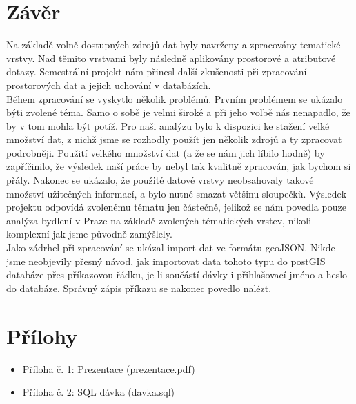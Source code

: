 \documentclass[a4paper, 12pt]{article}
\begin{document}
\clearpage

\section{Závěr}
Na základě volně dostupných zdrojů dat byly navrženy a zpracovány tematické vrstvy. Nad těmito vrstvami byly následně aplikovány prostorové a atributové dotazy. Semestrální projekt nám přinesl další zkušenosti při zpracování prostorových dat a jejich uchování v databázích.\\

Během zpracování se vyskytlo několik problémů. Prvním problémem se ukázalo býti zvolené téma. Samo o sobě je velmi široké a při jeho volbě nás nenapadlo, že by v tom mohla být potíž. Pro naši analýzu bylo k dispozici ke stažení velké množství dat, z nichž jsme se rozhodly použít jen několik zdrojů a ty zpracovat podrobněji. Použití velkého množství dat (a že se nám jich líbilo hodně) by zapříčinilo, že výsledek naší práce by nebyl tak kvalitně zpracován, jak bychom si přály. Nakonec se ukázalo, že použité datové vrstvy neobsahovaly takové množství užitečných informací, a bylo nutné smazat většinu sloupečků. Výsledek projektu odpovídá zvolenému tématu jen částečně, jelikož se nám povedla pouze analýza bydlení v Praze na základě zvolených tématických vrstev, nikoli komplexní jak jsme původně zamýšlely.\\

Jako zádrhel při zpracování se ukázal import dat ve formátu geoJSON. Nikde jsme neobjevily přesný návod, jak importovat data tohoto typu do postGIS databáze přes příkazovou řádku, je-li součástí dávky i přihlašovací jméno a heslo do databáze. Správný zápis příkazu se nakonec povedlo nalézt. 
\clearpage

\section{Přílohy} 

\begin{itemize}
\item Příloha č. 1: Prezentace (prezentace.pdf)
\item Příloha č. 2: SQL dávka (davka.sql)
\end{itemize}

\clearpage
\end{document}
